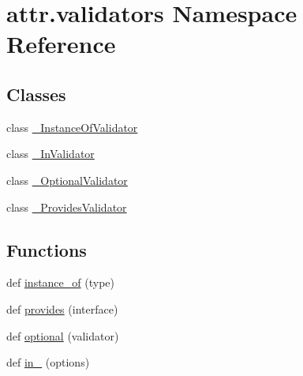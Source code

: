 \hypertarget{namespaceattr_1_1validators}{}\section{attr.\+validators Namespace Reference}
\label{namespaceattr_1_1validators}
\subsection*{Classes}
\begin{DoxyCompactItemize}
\item 
class \hyperlink{classattr_1_1validators_1_1___instance_of_validator}{\+\_\+\+Instance\+Of\+Validator}
\item 
class \hyperlink{classattr_1_1validators_1_1___in_validator}{\+\_\+\+In\+Validator}
\item 
class \hyperlink{classattr_1_1validators_1_1___optional_validator}{\+\_\+\+Optional\+Validator}
\item 
class \hyperlink{classattr_1_1validators_1_1___provides_validator}{\+\_\+\+Provides\+Validator}
\end{DoxyCompactItemize}
\subsection*{Functions}
\begin{DoxyCompactItemize}
\item 
def \hyperlink{namespaceattr_1_1validators_afb2ed7b7c580c1c23a2614e689c6b8ca}{instance\+\_\+of} (type)
\item 
def \hyperlink{namespaceattr_1_1validators_ab2a6c8a57857a955868028ae1c74595a}{provides} (interface)
\item 
def \hyperlink{namespaceattr_1_1validators_a16d222bb733631cf016c1e47f96d838c}{optional} (validator)
\item 
def \hyperlink{namespaceattr_1_1validators_ac9b231e7f5f70770d16101e73635934e}{in\+\_\+} (options)
\end{DoxyCompactItemize}
